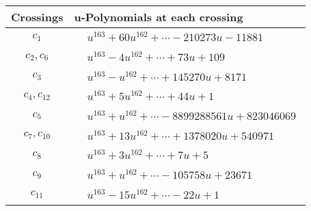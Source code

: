 \documentclass[1p]{elsarticle_modified}
\theoremstyle{definition}
\begin{document}
\begin{tabular}{m{50pt}|m{274pt}}
Crossings & \hspace{64pt}u-Polynomials at each crossing \\
\hline $$\begin{aligned}c_{1}\end{aligned}$$&$\begin{aligned}
&u^{163}+60 u^{162}+\cdots-210273 u-11881
\end{aligned}$\\
\hline $$\begin{aligned}c_{2},c_{6}\end{aligned}$$&$\begin{aligned}
&u^{163}-4 u^{162}+\cdots+73 u+109
\end{aligned}$\\
\hline $$\begin{aligned}c_{3}\end{aligned}$$&$\begin{aligned}
&u^{163}- u^{162}+\cdots+145270 u+8171
\end{aligned}$\\
\hline $$\begin{aligned}c_{4},c_{12}\end{aligned}$$&$\begin{aligned}
&u^{163}+5 u^{162}+\cdots+44 u+1
\end{aligned}$\\
\hline $$\begin{aligned}c_{5}\end{aligned}$$&$\begin{aligned}
&u^{163}+u^{162}+\cdots-8899288561 u+823046069
\end{aligned}$\\
\hline $$\begin{aligned}c_{7},c_{10}\end{aligned}$$&$\begin{aligned}
&u^{163}+13 u^{162}+\cdots+1378020 u+540971
\end{aligned}$\\
\hline $$\begin{aligned}c_{8}\end{aligned}$$&$\begin{aligned}
&u^{163}+3 u^{162}+\cdots+7 u+5
\end{aligned}$\\
\hline $$\begin{aligned}c_{9}\end{aligned}$$&$\begin{aligned}
&u^{163}+u^{162}+\cdots-105758 u+23671
\end{aligned}$\\
\hline $$\begin{aligned}c_{11}\end{aligned}$$&$\begin{aligned}
&u^{163}-15 u^{162}+\cdots-22 u+1
\end{aligned}$\\
\hline
\end{tabular}\\~\\
\end{document}
